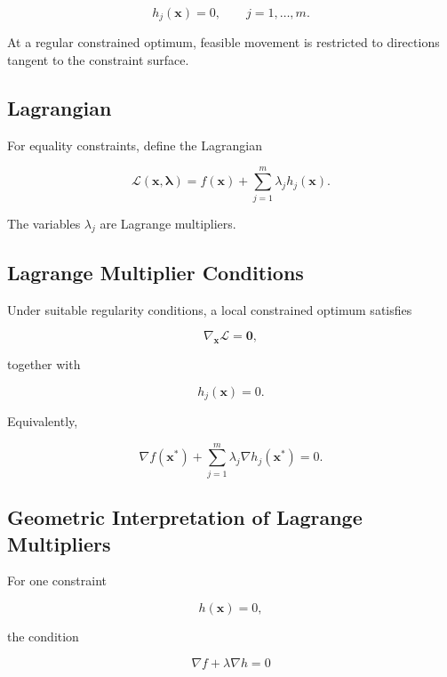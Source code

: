 \[
\boxed{
h_j(\mathbf{x})=0,
\qquad
j=1,\ldots,m.
}
\]

At a regular constrained optimum, feasible movement is restricted to
directions tangent to the constraint surface.

\subsection{Lagrangian}
\label{subsec:optimization-lagrangian}

For equality constraints, define the Lagrangian

\[
\boxed{
\mathcal{L}
(
\mathbf{x},
\boldsymbol{\lambda}
)
=
f(\mathbf{x})
+
\sum_{j=1}^{m}
\lambda_jh_j(\mathbf{x}).
}
\]

The variables \(\lambda_j\) are Lagrange multipliers.

\subsection{Lagrange Multiplier Conditions}
\label{subsec:lagrange-multiplier-conditions}

Under suitable regularity conditions, a local constrained optimum
satisfies

\[
\boxed{
\nabla_{\mathbf{x}}
\mathcal{L}
=
\mathbf{0},
}
\]

together with

\[
\boxed{
h_j(\mathbf{x})=0.
}
\]

Equivalently,

\[
\boxed{
\nabla f(\mathbf{x}^*)
+
\sum_{j=1}^{m}
\lambda_j
\nabla h_j(\mathbf{x}^*)
=
0.
}
\]

\subsection{Geometric Interpretation of Lagrange Multipliers}
\label{subsec:lagrange-geometric-interpretation}

For one constraint

\[
h(\mathbf{x})=0,
\]

the condition

\[
\nabla f
+
\lambda\nabla h
=
0
\]

